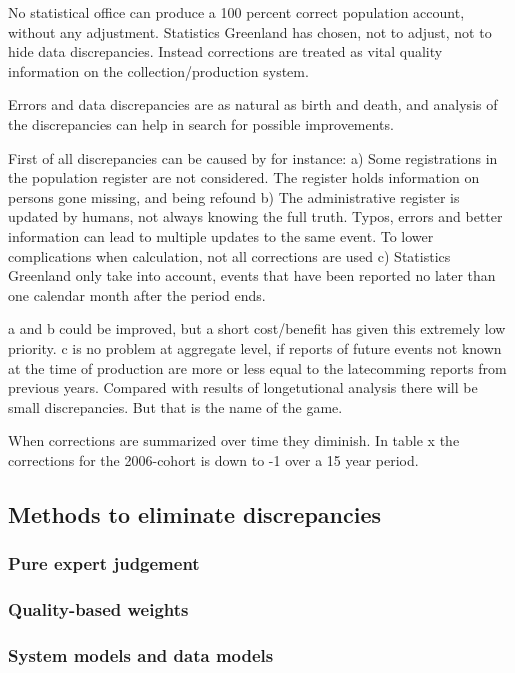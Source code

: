 \documentclass[USenglish]{article}
\begin{document}
No statistical office can produce a 100 percent correct population account, without any adjustment. Statistics Greenland has chosen, not to adjust, not to hide data discrepancies. Instead corrections are treated as vital quality information on the collection/production system.

Errors and data discrepancies are as natural as birth and death, and analysis of the discrepancies can help in search for possible improvements.

First of all discrepancies can be caused by for instance: a) Some registrations in the population register are not considered. The register holds information on persons gone missing, and being refound b) The administrative register is updated by humans, not always knowing the full truth. Typos, errors and better information can lead to multiple updates to the same event. To lower complications when calculation, not all corrections are used c) Statistics Greenland only take into account, events that have been reported no later than one calendar month after the period ends.

a and b could be improved, but a short cost/benefit has given this extremely low priority. c is no problem at aggregate level, if reports of future events not known at the time of production are more or less equal to the latecomming reports from previous years. Compared with results of longetutional analysis there will be small discrepancies. But that is the name of the game.

When corrections are summarized over time they diminish. In table x the corrections for the 2006-cohort is down to -1 over a 15 year period. 

\subsection{Methods to eliminate discrepancies}

\subsubsection{Pure expert judgement}

\citep{lomax2013subnational}


\subsubsection{Quality-based weights}




\subsubsection{System models and data models}
\end{document}
